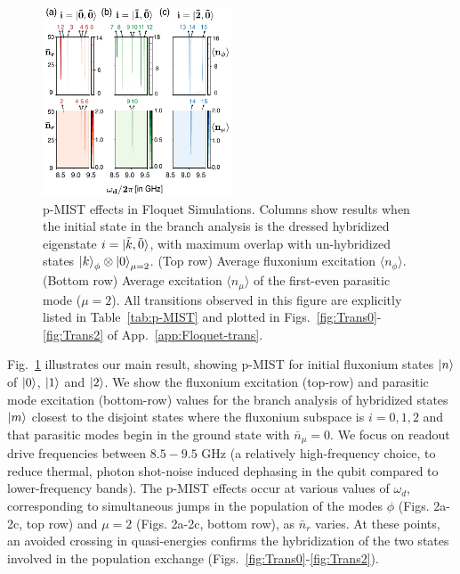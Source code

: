 \documentclass[prx,showpacs,notitlepage,twocolumn,superscriptaddress,nofootinbib,preprintnumbers,floatfix]{revtex4-2}
\begin{document}
\begin{figure}[!htb]
    \centering
    \includegraphics[width=0.5\textwidth]{Figures/Floquet_min.pdf}
    \caption{p-MIST effects in Floquet Simulations. Columns show results when the initial state in the branch analysis is the dressed hybridized eigenstate $i=\ket{\tilde{k},\tilde{0}}$, with maximum overlap with un-hybridized states $\ket{k}_\phi\otimes\ket{0}_{\mu=2}$. (Top row) Average fluxonium excitation $\langle n_\phi\rangle $. (Bottom row) Average excitation $\langle n_\mu\rangle$ of the first-even parasitic mode ($\mu=2$). %
    All transitions observed in this figure are explicitly listed in Table~\ref{tab:p-MIST} and plotted in Figs.~\ref{fig:Trans0}-\ref{fig:Trans2} of App.~\ref{app:Floquet-trans}.}
    \label{fig:Floquet}
\end{figure}
Fig.~\ref{fig:Floquet} illustrates our main result, showing p-MIST for initial fluxonium states $\ket{n}$ of $\ket{0}$, $\ket{1}$ and $\ket{2}$. We show the fluxonium excitation (top-row) and parasitic mode excitation (bottom-row) values for the branch analysis of hybridized states $\ket{m}$ closest to the disjoint states where the fluxonium subspace is $i=0,1,2$ and that parasitic modes begin in the ground state with $\bar n_\mu=0$. We focus on readout drive frequencies between $8.5 - 9.5$ GHz (a relatively high-frequency choice, to reduce thermal, photon shot-noise induced dephasing in the qubit compared to lower-frequency bands). The p-MIST effects occur at various values of $\omega_d$, corresponding to simultaneous jumps in the population of the modes $\phi$ (Figs. 2a-2c, top row) and $\mu=2$ (Figs. 2a-2c, bottom row), as $\bar{n}_r$ varies. At these points, an avoided crossing in quasi-energies confirms the hybridization of the two states involved in the population exchange (Figs.~\ref{fig:Trans0}-\ref{fig:Trans2}).
\end{document}
